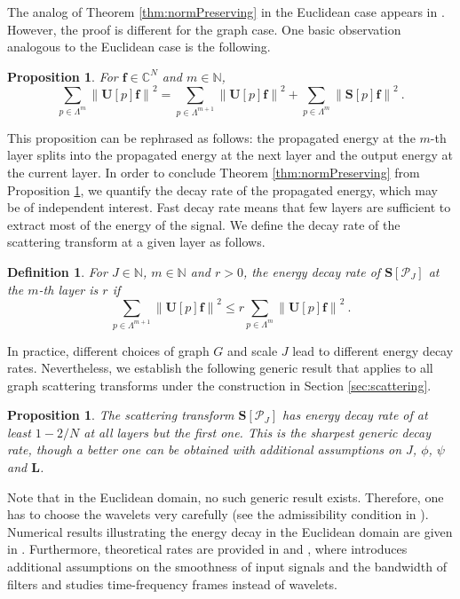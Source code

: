 \documentclass{article}
\newtheorem{proposition}[theorem]{Proposition}
\newtheorem{definition}{Definition}
\def\CC{\mathbb{C}}
\def\NN{\mathbb{N}}
\def\cP{\mathcal{P}}
\def\BL{\boldsymbol{L}}
\def\BS{\boldsymbol{S}}
\def\BU{\boldsymbol{U}}
\def\Bf{\boldsymbol{f}}
\newcommand{\norm}[1]{\left\lVert#1\right\rVert}
\begin{document}
The analog of Theorem \ref{thm:normPreserving} in the Euclidean case appears in \cite[Theorem 2.6]{Mal13}. However, the proof is different for the graph case. One basic observation analogous to the Euclidean case is the following.
\begin{proposition}\label{prop:energySplit}
For $\Bf \in \CC^N$ and $m \in \NN$,
\begin{equation}\label{eq:energyPreserve}
\sum_{p \in \Lambda^m} \norm{\BU[p] \Bf}^2 = \sum_{p \in \Lambda^{m+1}} \norm{\BU[p] \Bf}^2 + \sum_{p \in \Lambda^m} \norm{\BS[p] \Bf}^2 ~.
\end{equation}
\end{proposition}
This proposition can be rephrased as follows: the propagated energy at the $m$-th layer splits into the propagated energy at the next layer and the output energy at the current layer. In order to conclude Theorem \ref{thm:normPreserving} from Proposition \ref{prop:energySplit}, we quantify the decay rate of the propagated energy, which may be of independent interest. Fast decay rate means that few layers are sufficient to extract most of the energy of the signal. 
We define the decay rate of the scattering transform at a given layer as follows.
\begin{definition}
For $J \in \NN$, $m \in \NN$ and $r > 0$,  the  \emph{energy decay rate} of $\BS[\cP_J]$ at the $m$-th layer is $r$ if
\begin{equation}
\sum_{p \in \Lambda^{m+1}} \norm{\BU[p] \Bf}^2 \leq r \sum_{p \in \Lambda^m} \norm{\BU[p] \Bf}^2 ~.
\end{equation}
\end{definition}
In practice, different choices of graph $G$ and scale $J$ lead to different energy decay rates. Nevertheless, we establish the following generic result that applies to all graph scattering transforms under the construction in Section \ref{sec:scattering}.
\begin{proposition}\label{prop:layer}
The scattering transform $\BS[\cP_J]$ has energy decay rate of at least $1-2/N$ at all layers but the first one. This is the sharpest generic decay rate, though a better one can be obtained with additional assumptions on $J$, $\phi$, $\psi$ and $\BL$.
\end{proposition}
Note that in the Euclidean domain, no such generic result exists. Therefore, one has to choose the wavelets very carefully (see the admissibility condition in \cite[Theorem 2.6]{Mal13}). Numerical results illustrating the energy decay in the Euclidean domain are given in \cite{BruM13}. Furthermore,  theoretical rates are provided in \cite{WiaGB17} and \cite{CzaL17}, where \cite{WiaGB17} introduces  additional assumptions on the smoothness of input signals and the bandwidth of filters 
and \cite{CzaL17} studies time-frequency frames instead of wavelets. 
\end{document}
